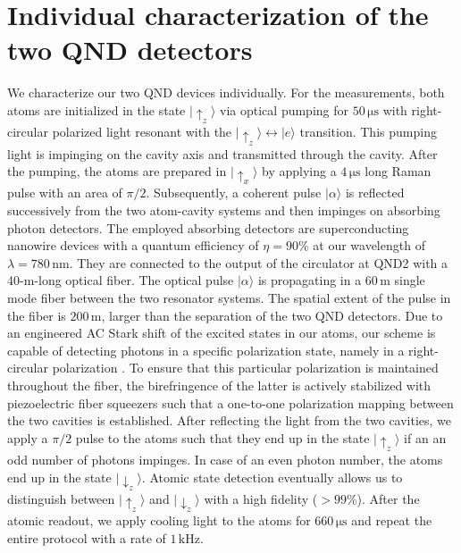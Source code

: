 \documentclass[prl,amsmath,amssymb,bibnotes,aps,longbibliography,12pt]{revtex4-1}
\newcommand{\ket}[1]{|{#1}\rangle}
\begin{document}
\section{Individual characterization of the two QND detectors}
\noindent We characterize our two QND devices individually. For the measurements, both atoms are initialized in the state $\ket{\uparrow_z}$ via optical pumping for $50\,\mathrm{\mu s}$ with right-circular polarized light resonant with the $\ket{\uparrow_z}\leftrightarrow \ket{e}$ transition. This pumping light is impinging on the cavity axis and transmitted through the cavity. After the pumping, the atoms are prepared in $\ket{\uparrow_x}$ by applying a $4\,\mathrm{\mu s}$ long Raman pulse with an area of $\pi/2$. Subsequently, a coherent pulse $\ket{\alpha}$ is reflected successively from the two atom-cavity systems and then impinges on absorbing photon detectors. The employed absorbing detectors are superconducting nanowire devices with a quantum efficiency of $\eta=90\%$ at our wavelength of $\lambda=780\,\mathrm{nm}$. They are connected to the output of the circulator at QND2 with a 40-m-long optical fiber. The optical pulse $\ket{\alpha}$ is propagating in a $60\,\mathrm{m}$ single mode fiber between the two resonator systems. The spatial extent of the pulse in the fiber is $200\,\mathrm{m}$, larger than the separation of the two QND detectors. Due to an engineered AC Stark shift of the excited states in our atoms, our scheme is capable of detecting photons in a specific polarization state, namely in a right-circular polarization \cite{hacker2019supplement}. To ensure that this particular polarization is maintained throughout the fiber, the birefringence of the latter is actively stabilized with piezoelectric fiber squeezers \cite{rosenfeld2008supplement} such that a one-to-one polarization mapping between the two cavities is established. After reflecting the light from the two cavities, we apply a $\pi/2$ pulse to the atoms such that they end up in the state $\ket{\uparrow_z}$ if an an odd number of photons impinges. In case of an even photon number, the atoms end up in the state $\ket{\downarrow_z}$. Atomic state detection eventually allows us to distinguish between $\ket{\uparrow_z}$ and $\ket{\downarrow_z}$ with a high fidelity ($>99\%$). After the atomic readout, we apply cooling light to the atoms for $660\,\mathrm{\mu s}$ and repeat the entire protocol with a rate of $1\,\mathrm{kHz}$.
\end{document}
